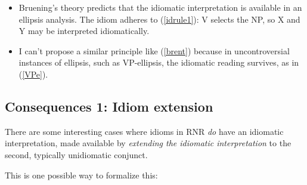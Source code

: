 \documentclass[paper=letter, fontsize=12pt]{scrartcl} %
\numberwithin{equation}{section} %
\numberwithin{figure}{section} %
\numberwithin{table}{section} %
\begin{document}
\begin{itemize}
\item Bruening's theory predicts that the idiomatic interpretation is available in an ellipsis analysis. The idiom adheres to (\ref{idrule1}): V selects the NP, so X and Y may be interpreted idiomatically. 
\item I can't propose a similar principle like (\ref{brent}) because in uncontroversial instances of ellipsis, such as VP-ellipsis, the idiomatic reading survives, as in (\ref{VPe}).
\end{itemize}

\begin{exe}
\label{VPe}
\end{exe}

\newpage

\subsection{Consequences 1: Idiom extension}

There are some interesting cases where idioms in RNR \textit{do} have an idiomatic interpretation, made available by \textit{extending the idiomatic interpretation} to the second, typically unidiomatic conjunct. 

\begin{exe}
\label{id-ext1}
\label{id-ext2}
\end{exe}

This is one possible way to formalize this:

\begin{exe}
\label{brent2}
\end{exe}
\end{document}

